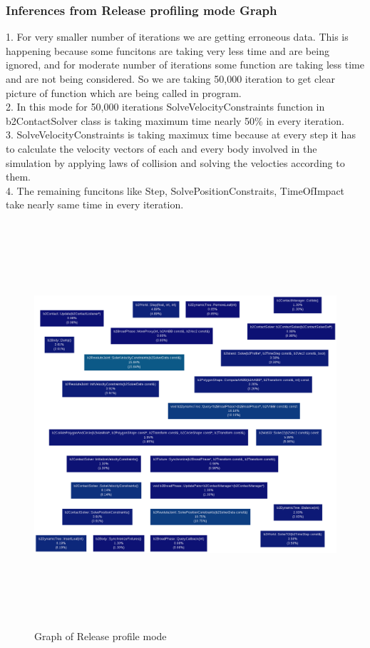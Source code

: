 \documentclass[11pt]{article}
\begin{document}
\subsubsection{Inferences from Release profiling mode Graph}
1. For very smaller number of iterations we are getting erroneous data. This is happening because some funcitons are taking 		very less time and are being ignored, and for moderate number of iterations some function are taking less time and are not 		being considered. So we are taking 50,000 iteration to get clear picture of function which are being called in program. \\
2. In this mode for 50,000 iterations SolveVelocityConstraints function in b2ContactSolver class is taking maximum time nearly 	   50\% in every iteration. \\
3. SolveVelocityConstraints is taking maximux time because at every step it has to calculate the velocity vectors of each and 		every body involved in the simulation by applying laws of collision and solving the velocties according to them. \\
4. The remaining funcitons like Step, SolvePositionConstraits, TimeOfImpact take nearly same time in every iteration. \\
\begin{figure}[H]
\centering
\includegraphics[height=15cm]{release.png}
\caption{Graph of Release profile mode}
\end{figure}
\end{document}
